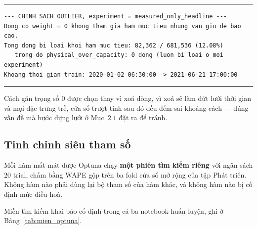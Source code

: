 \documentclass[12pt,a4paper]{article}
\renewcommand{\baselinestretch}{1.35}
\begin{document}
\begingroup
\par\vspace{6pt}\hrule\vspace{4pt}
\small\renewcommand{\baselinestretch}{1.0}\selectfont
\begin{verbatim}
--- CHINH SACH OUTLIER, experiment = measured_only_headline ---
Dong co weight = 0 khong tham gia ham muc tieu nhung van giu de bao cao.
Tong dong bi loai khoi ham muc tieu: 82,362 / 681,536 (12.08%)
   trong do physical_over_capacity: 0 dong (luon bi loai o moi experiment)
Khoang thoi gian train: 2020-01-02 06:30:00 -> 2021-06-21 17:00:00
\end{verbatim}
\vspace{2pt}\hrule\par\vspace{6pt}
\endgroup

Cách gán trọng số $0$ được chọn thay vì xoá dòng, vì xoá sẽ làm đứt lưới thời gian và mọi đặc
trưng trễ, cửa sổ trượt tính sau đó đều đếm sai khoảng cách --- đúng vấn đề mà bước dựng lưới ở
Mục~$2.1$ đặt ra để tránh.

\subsection{Tinh chỉnh siêu tham số}

Mỗi hàm mất mát được Optuna chạy \textbf{một phiên tìm kiếm riêng} với ngân sách $20$ trial,
chấm bằng WAPE gộp trên ba fold cửa sổ mở rộng của tập Phát triển. Không hàm nào phải dùng lại
bộ tham số của hàm khác, và không hàm nào bị cố định mức điều hoà.

Miền tìm kiếm khai báo cố định trong cả ba notebook huấn luyện, ghi ở
Bảng~\ref{tab:mien_optuna}.
\end{document}

